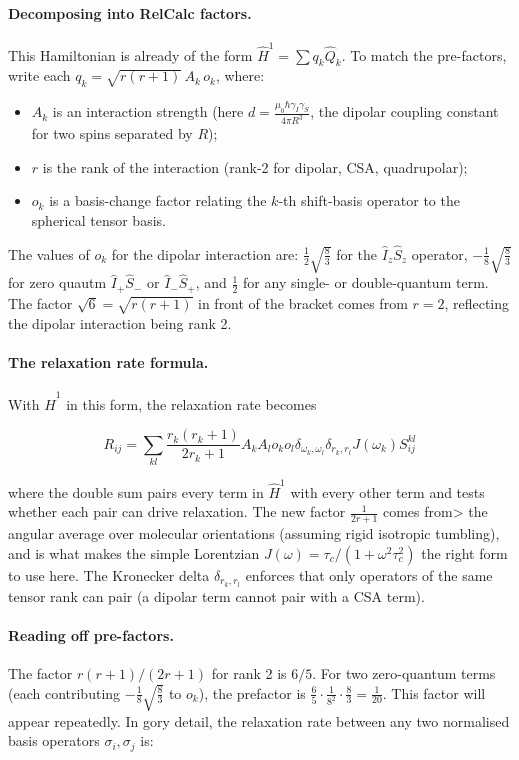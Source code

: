 \documentclass[notitlepage,11pt]{article}
\begin{document}
\paragraph{Decomposing into RelCalc factors.} This Hamiltonian is already of the form $\hat{H}^1=\sum q_k\hat{Q}_k$. To match the pre-factors, write each $q_k=\sqrt{r(r+1)}\,A_k\,o_k$, where:
\begin{itemize}
    \item $A_k$ is an interaction strength (here $d=\frac{\mu_0\hbar\gamma_I\gamma_S}{4\pi R^3}$, the dipolar coupling constant for two spins separated by $R$);
    \item $r$ is the rank of the interaction (rank-2 for dipolar, CSA, quadrupolar);
    \item $o_k$ is a basis-change factor relating the $k$-th shift-basis operator to the spherical tensor basis.
\end{itemize}
The values of $o_k$ for the dipolar interaction are: $\tfrac{1}{2}\sqrt{\tfrac{8}{3}}$ for the $\hat{I}_z\hat{S}_z$ operator, $-\tfrac{1}{8}\sqrt{\tfrac{8}{3}}$ for zero quautm $\hat{I}_+\hat{S}_-$ or $\hat{I}_-\hat{S}_+$, and $\tfrac{1}{2}$ for any single- or double-quantum term. The factor $\sqrt{6}=\sqrt{r(r+1)}$ in front of the bracket comes from $r=2$, reflecting the dipolar interaction being rank 2.

\paragraph{The relaxation rate formula.} With $\hat{H}^1$ in this form, the relaxation rate becomes

\begin{equation}
R_{ij}= \sum_{kl} \frac{r_k(r_k+1)}{2r_k+1} A_kA_lo_ko_l \delta_{\omega_k,\omega_l} \delta_{r_k,r_l} J(\omega_k) S_{ij}^{kl}
\end{equation}

where the double sum pairs every term in $\hat{H}^1$ with every other term and tests whether each pair can drive relaxation. The new factor $\tfrac{1}{2r+1}$ comes from> the angular average over molecular orientations (assuming rigid isotropic tumbling), and is what makes the simple Lorentzian $J(\omega)=\tau_c/(1+\omega^2\tau_c^2)$ the right form to use here. The Kronecker delta $\delta_{r_k,r_l}$ enforces that only operators of the same tensor rank can pair (a dipolar term cannot pair with a CSA term).

\paragraph{Reading off pre-factors.} The factor $r(r+1)/(2r+1)$ for rank 2 is $6/5$. For two zero-quantum terms (each contributing $-\tfrac{1}{8}\sqrt{\tfrac{8}{3}}$ to $o_k$), the prefactor is $\tfrac{6}{5}\cdot\tfrac{1}{8^2}\cdot\tfrac{8}{3}=\tfrac{1}{20}$. This factor will appear repeatedly. In gory detail, the relaxation rate between any two normalised basis operators $\sigma_i,\sigma_j$ is:
\end{document}
